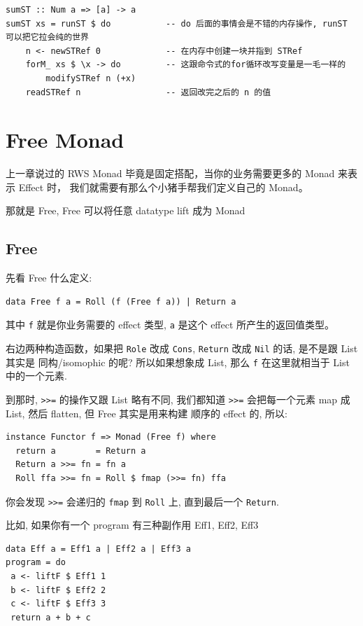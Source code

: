 \documentclass[11pt]{tufte-book}
\begin{document}
\begin{verbatim}
sumST :: Num a => [a] -> a
sumST xs = runST $ do           -- do 后面的事情会是不错的内存操作, runST 可以把它拉会纯的世界
    n <- newSTRef 0             -- 在内存中创建一块并指到 STRef
    forM_ xs $ \x -> do         -- 这跟命令式的for循环改写变量是一毛一样的
        modifySTRef n (+x)
    readSTRef n                 -- 返回改完之后的 n 的值
\end{verbatim}

\chapter{Free Monad}
\label{sec:org6bb1e39}
上一章说过的 RWS Monad 毕竟是固定搭配，当你的业务需要更多的 Monad 来表示 Effect 时，
我们就需要有那么个小猪手帮我们定义自己的 Monad。

那就是 Free, Free 可以将任意 datatype lift 成为 Monad

\section{Free}
\label{sec:org304a527}
先看 Free 什么定义:

\begin{verbatim}
data Free f a = Roll (f (Free f a)) | Return a
\end{verbatim}

其中 \texttt{f} 就是你业务需要的 effect 类型, \texttt{a} 是这个 effect 所产生的返回值类型。

右边两种构造函数，如果把 \texttt{Role} 改成 \texttt{Cons}, \texttt{Return} 改成 \texttt{Nil} 的话, 是不是跟 List 其实是 同构/isomophic 的呢? 所以如果想象成 List, 那么 \texttt{f} 在这里就相当于 List 中的一个元素.

到那时, \texttt{>>=} 的操作又跟 List 略有不同, 我们都知道 \texttt{>>=} 会把每一个元素 map 成 List, 然后 flatten, 但 Free 其实是用来构建
顺序的 effect 的, 所以:

\begin{verbatim}
instance Functor f => Monad (Free f) where
  return a        = Return a
  Return a >>= fn = fn a
  Roll ffa >>= fn = Roll $ fmap (>>= fn) ffa
\end{verbatim}

你会发现 \texttt{>>=} 会递归的 \texttt{fmap} 到 \texttt{Roll} 上, 直到最后一个 \texttt{Return}.

比如, 如果你有一个 program 有三种副作用 Eff1, Eff2, Eff3

\begin{verbatim}
data Eff a = Eff1 a | Eff2 a | Eff3 a
program = do
 a <- liftF $ Eff1 1
 b <- liftF $ Eff2 2
 c <- liftF $ Eff3 3
 return a + b + c
\end{verbatim}
\end{document}

